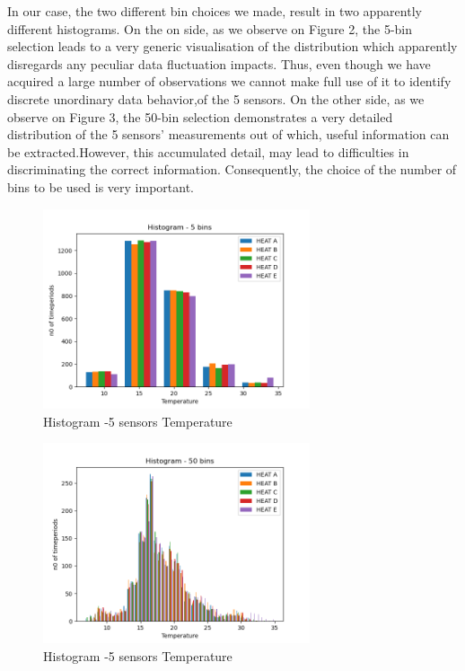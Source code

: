 \documentclass[a4paper,12pt]{article} %
\begin{document}
\setlength{\parindent}{8ex}In our case, the two different bin choices we made, result in two apparently different histograms. On the on side, as we observe on Figure 2, the 5-bin selection leads to a very generic visualisation of the distribution which apparently disregards any peculiar data fluctuation impacts. Thus, even though we have acquired a large number of observations we cannot make full use of it to identify discrete unordinary data behavior,of the 5 sensors. On the other side, as we observe on Figure 3, the 50-bin selection demonstrates a very detailed distribution of the 5 sensors' measurements out of which, useful information can be extracted.However, this accumulated detail, may lead to difficulties in discriminating the correct information. Consequently, the choice of the number of bins to be used is very important.
\vspace{10mm}
 \begin{figure}[H]   
	\centering 
	\includegraphics[width=0.7\textwidth]{Figure_1.png}
	\caption{Histogram -5 sensors Temperature} 
\end{figure}
 \begin{figure}[H]   
	\centering 
	\includegraphics[width=0.7\textwidth]{Figure_2.png}
	\caption{Histogram -5 sensors Temperature} 
\end{figure}
	
\end{document}
